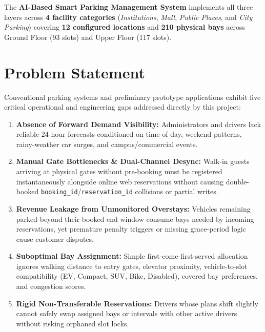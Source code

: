 \documentclass[12pt,a4paper,oneside]{report}
\begin{document}
The \textbf{AI-Based Smart Parking Management System} implements all three layers across \textbf{4 facility categories} (\textit{Institutions}, \textit{Mall}, \textit{Public Places}, and \textit{City Parking}) covering \textbf{12 configured locations} and \textbf{210 physical bays} across Ground Floor (93 slots) and Upper Floor (117 slots).

\section{Problem Statement}
Conventional parking systems and preliminary prototype applications exhibit five critical operational and engineering gaps addressed directly by this project:
\begin{enumerate}[leftmargin=*]
  \item \textbf{Absence of Forward Demand Visibility:} Administrators and drivers lack reliable 24-hour forecasts conditioned on time of day, weekend patterns, rainy-weather car surges, and campus/commercial events.
  \item \textbf{Manual Gate Bottlenecks \& Dual-Channel Desync:} Walk-in guests arriving at physical gates without pre-booking must be registered instantaneously alongside online web reservations without causing double-booked \texttt{booking\_id}/\texttt{reservation\_id} collisions or partial writes.
  \item \textbf{Revenue Leakage from Unmonitored Overstays:} Vehicles remaining parked beyond their booked end window consume bays needed by incoming reservations, yet premature penalty triggers or missing grace-period logic cause customer disputes.
  \item \textbf{Suboptimal Bay Assignment:} Simple first-come-first-served allocation ignores walking distance to entry gates, elevator proximity, vehicle-to-slot compatibility (EV, Compact, SUV, Bike, Disabled), covered bay preferences, and congestion scores.
  \item \textbf{Rigid Non-Transferable Reservations:} Drivers whose plans shift slightly cannot safely swap assigned bays or intervals with other active drivers without risking orphaned slot locks.
\end{enumerate}
\end{document}
